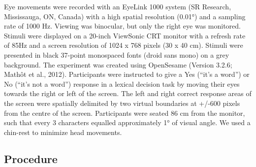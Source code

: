 \documentclass[
  a4paper,12pt,twoside,onecolumn,openright,final,oldfontcommands]{memoir}
\begin{document}
Eye movements were recorded with an EyeLink 1000 system (SR Research, Mississauga, ON, Canada) with a high spatial resolution (0.01°) and a sampling rate of 1000 Hz. Viewing was binocular, but only the right eye was monitored. Stimuli were displayed on a 20-inch ViewSonic CRT monitor with a refresh rate of 85Hz and a screen resolution of 1024 x 768 pixels (30 x 40 cm). Stimuli were presented in black 37-point monospaced fonts (droid sans mono) on a grey background. The experiment was created using OpenSesame (Version 3.2.6; Mathôt et al., 2012). Participants were instructed to give a Yes (``it's a word'') or No (``it's not a word'') response in a lexical decision task by moving their eyes towards the right or left of the screen. The left and right correct response areas of the screen were spatially delimited by two virtual boundaries at +/-600 pixels from the centre of the screen. Participants were seated 86 cm from the monitor, such that every 3 characters equalled approximately 1° of visual angle. We used a chin-rest to minimize head movements.

\hypertarget{procedure-1}{%
\subsection{Procedure}\label{procedure-1}}
\end{document}
